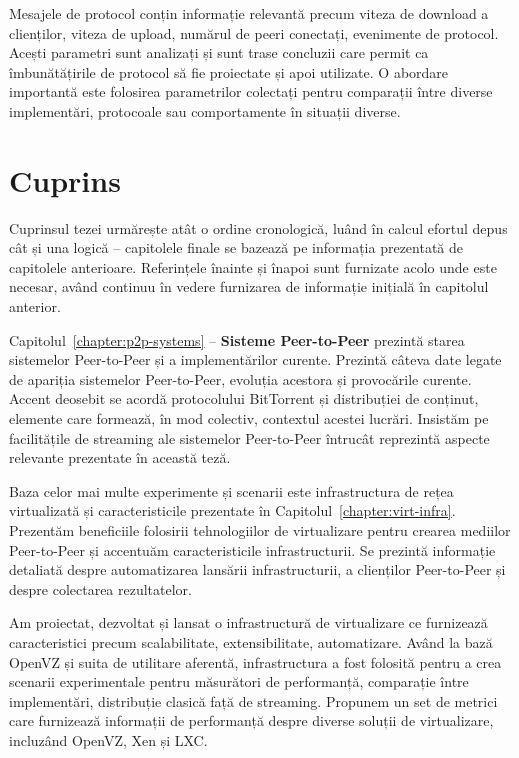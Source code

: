 Mesajele de protocol conțin informație relevantă precum viteza de download a
clienților, viteza de upload, numărul de peeri conectați, evenimente de
protocol. Acești parametri sunt analizați și sunt trase concluzii care permit
ca îmbunătățirile de protocol să fie proiectate și apoi utilizate. O abordare
importantă este folosirea parametrilor colectați pentru comparații între
diverse implementări, protocoale sau comportamente în situații diverse.

\section{Cuprins}
\label{sec:intro:contents}

Cuprinsul tezei urmărește atât o ordine cronologică, luând în calcul efortul
depus cât și una logică -- capitolele finale se bazează pe informația
prezentată de capitolele anterioare. Referințele înainte și înapoi sunt
furnizate acolo unde este necesar, având continuu în vedere furnizarea de
informație inițială în capitolul anterior.

Capitolul~\ref{chapter:p2p-systems} -- \textbf{Sisteme Peer-to-Peer} prezintă
starea sistemelor Peer-to-Peer și a implementărilor curente. Prezintă câteva
date legate de apariția sistemelor Peer-to-Peer, evoluția acestora și
provocările curente. Accent deosebit se acordă protocolului BitTorrent și
distribuției de conținut, elemente care formează, în mod colectiv, contextul
acestei lucrări. Insistăm pe facilitățile de streaming ale sistemelor
Peer-to-Peer întrucât reprezintă aspecte relevante prezentate în această teză.

Baza celor mai multe experimente și scenarii este infrastructura de rețea
virtualizată și caracteristicile prezentate în
Capitolul~\ref{chapter:virt-infra}. Prezentăm beneficiile folosirii
tehnologiilor de virtualizare pentru crearea mediilor Peer-to-Peer și
accentuăm caracteristicile infrastructurii. Se prezintă informație detaliată
despre automatizarea lansării infrastructurii, a clienților Peer-to-Peer și
despre colectarea rezultatelor.

Am proiectat, dezvoltat și lansat o infrastructură de virtualizare ce
furnizează caracteristici precum scalabilitate, extensibilitate, automatizare.
Având la bază OpenVZ și suita de utilitare aferentă, infrastructura a fost
folosită pentru a crea scenarii experimentale pentru măsurători de
performanță, comparație între implementări, distribuție clasică față de
streaming. Propunem un set de metrici care furnizează informații de
performanță despre diverse soluții de virtualizare, incluzând OpenVZ, Xen și
LXC.

